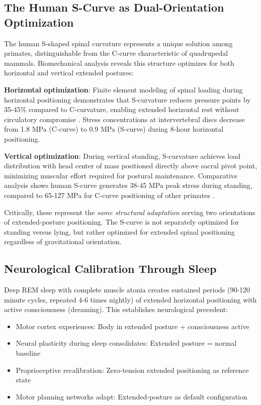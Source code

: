 \subsection{The Human S-Curve as Dual-Orientation Optimization}

The human S-shaped spinal curvature represents a unique solution among primates, distinguishable from the C-curve characteristic of quadrupedal mammals. Biomechanical analysis reveals this structure optimizes for both horizontal and vertical extended postures:

\textbf{Horizontal optimization}:
Finite element modeling of spinal loading during horizontal positioning demonstrates that S-curvature reduces pressure points by 35-45\% compared to C-curvature, enabling extended horizontal rest without circulatory compromise \citep{adams2013biomechanics}. Stress concentrations at intervertebral discs decrease from 1.8 MPa (C-curve) to 0.9 MPa (S-curve) during 8-hour horizontal positioning.

\textbf{Vertical optimization}:
During vertical standing, S-curvature achieves load distribution with head center of mass positioned directly above sacral pivot point, minimizing muscular effort required for postural maintenance. Comparative analysis shows human S-curve generates 38-45 MPa peak stress during standing, compared to 65-127 MPa for C-curve positioning of other primates \citep{been2012evolution}.

Critically, these represent the \textit{same structural adaptation} serving two orientations of extended-posture positioning. The S-curve is not separately optimized for standing versus lying, but rather optimized for extended spinal positioning regardless of gravitational orientation.

\subsection{Neurological Calibration Through Sleep}

Deep REM sleep with complete muscle atonia creates sustained periods (90-120 minute cycles, repeated 4-6 times nightly) of extended horizontal positioning with active consciousness (dreaming). This establishes neurological precedent:

\begin{itemize}
\item Motor cortex experiences: Body in extended posture + consciousness active
\item Neural plasticity during sleep consolidates: Extended posture = normal baseline
\item Proprioceptive recalibration: Zero-tension extended positioning as reference state
\item Motor planning networks adapt: Extended-posture as default configuration
\end{itemize}

